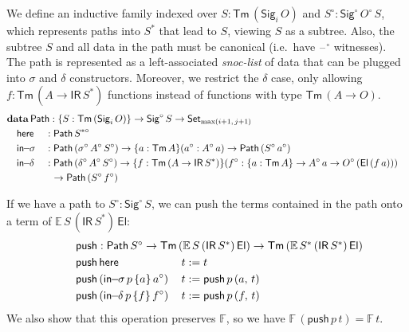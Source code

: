 \documentclass[acmsmall,screen,review,anonymous]{acmart}
\newcommand{\msf}[1]{{\mathsf{#1}}}
\newcommand{\mbf}[1]{{\mathbf{#1}}}
\newcommand{\mbb}[1]{\mathbb{#1}}
\newcommand{\push}{\mathsf{push}}
\newcommand{\data}{\mbf{data}}
\newcommand{\Set}{\msf{Set}}
\newcommand{\El}{\msf{El}}
\newcommand{\Sig}{\msf{Sig}}
\newcommand{\blank}{{\mathord{\hspace{1pt}\text{--}\hspace{1pt}}}}
\newcommand{\IR}{\msf{IR}}
\newcommand{\Tm}{\msf{Tm}}
\newcommand{\w}{\circ}
\newcommand{\Path}{\msf{Path}}
\newcommand{\here}{\msf{here}}
\newcommand{\Ssw}{S^{*\w}}
\newcommand{\insigma}{\msf{in}\!\!-\!\!\sigma}
\newcommand{\indelta}{\msf{in}\!\!-\!\!\delta}
\newcommand{\E}{\mbb{E}}
\newcommand{\F}{\mbb{F}}
\begin{document}
\begin{definition}
We define an inductive family indexed
over $S : \Tm\,(\Sig_i\,O)$ and $S^\w : \Sig^\w\,O^\w\,S$, which represents paths into $S^*$ that lead to $S$, viewing
$S$ as a subtree. Also, the subtree $S$ and all data in the path must be canonical (i.e.\ have $\blank^\w$
witnesses). The path is represented as a left-associated \emph{snoc-list} of data that can be
plugged into $\sigma$ and $\delta$ constructors. Moreover, we restrict the $\delta$ case, only
allowing $f : \Tm\,(A \to \IR\,S^*)$ functions instead of functions with type $\Tm\,(A \to O)$.
\begin{alignat*}{4}
  &\rlap{$\data\,\Path : \{S : \Tm\,(\Sig_i\,O)\} \to \Sig^\w\,S \to \Set_{\max(i+1,\,j+1)}$}\\
  &\quad \here    &&: \Path\,\Ssw\\
  &\quad \insigma &&: \Path\,(\sigma^\w\,A^\w\,S^\w) \to \{a : \Tm\,A\}(a^\w : A^\w\,a) \to \Path\,(S^\w\,a^\w) \\
  &\quad \indelta &&: \Path\,(\delta^\w\,A^\w\,S^\w) \to \{f : \Tm\,(A \to \IR\,S^*)\}(f^\w : \{a : \Tm\,A\} \to A^\w\,a \to O^\w\,(\El\,(f\,a)))\\
  &               && \hspace{0.6em} \to \Path\,(S^\w\,f^\w)
\end{alignat*}

If we have a path to $S^\w : \Sig^\w\,S$, we can push the terms contained in the path onto a
term of $\E\,S\,(\IR\,S^*)\,\El$:
\begin{alignat*}{4}
  & \hspace{-6em}\rlap{$\push : \Path\,S^\w \to \Tm\,(\E\,S\,(\IR\,S^*)\,\El) \to \Tm\,(\E\,S^*\,(\IR\,S^*)\,\El)$}\\
  & \hspace{-6em}\push\,\here\,                     &&t := t\\
  & \hspace{-6em}\push\,(\insigma\,p\,\{a\}\,a^\w)\,&&t := \push\,p\,(a,\,t)\\
  & \hspace{-6em}\push\,(\indelta\,p\,\{f\}\,f^\w)\,&&t := \push\,p\,(f,\,t)
\end{alignat*}
We also show that this operation preserves $\F$, so we have $\F\,(\push\,p\,t) = \F\,t$.
\end{definition}
\end{document}
